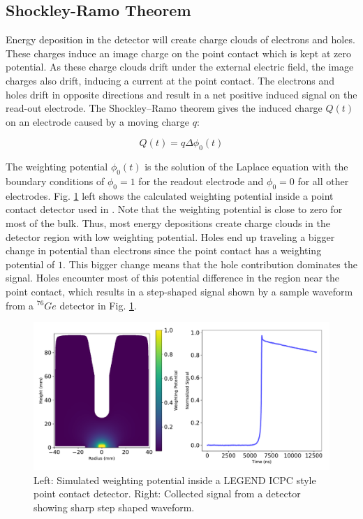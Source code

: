 \subsection{Shockley-Ramo Theorem}
Energy deposition in the detector will create charge clouds of electrons and holes. These charges induce an image charge on the point contact which is kept at zero potential. As these charge clouds drift under the external electric field, the image charges also drift, inducing a current at the point contact. The electrons and holes drift in opposite directions and result in a net positive induced signal on the read-out electrode. The Shockley–Ramo theorem gives the induced charge $Q(t)$ on an electrode caused by a moving charge $q$:

\begin{equation}\label{wp_eq}
Q(t)=q\Delta \phi_0(t)
\end{equation}

The weighting potential $\phi_0(t)$ is the solution of the Laplace equation with the boundary conditions of $\phi_0=1$ for the readout electrode and $\phi_0=0$ for all other electrodes. Fig. \ref{fig:wp_signal} left shows the calculated weighting potential inside a point contact detector used in {\MJD}. Note that the weighting potential is close to zero for most of the bulk. Thus, most energy depositions create charge clouds in the detector region with low weighting potential. Holes end up traveling a bigger change in potential than electrons since the point contact has a weighting potential of $1$. This bigger change means that the hole contribution dominates the signal. Holes encounter most of this potential difference in the region near the point contact, which results in a step-shaped signal shown by a sample waveform from a ${}^{76}Ge$ detector in Fig. \ref{fig:wp_signal}.

  \begin{figure}[htb]
  \centering
  \includegraphics[trim=0 0.5cm 0 0,clip,width=\linewidth]{ch2/figs/wp_det.pdf}
  \caption{Left: Simulated weighting potential inside a LEGEND ICPC style point contact detector. Right: Collected signal from a detector showing sharp step shaped waveform.}
    \label{fig:wp_signal}
  \end{figure}


